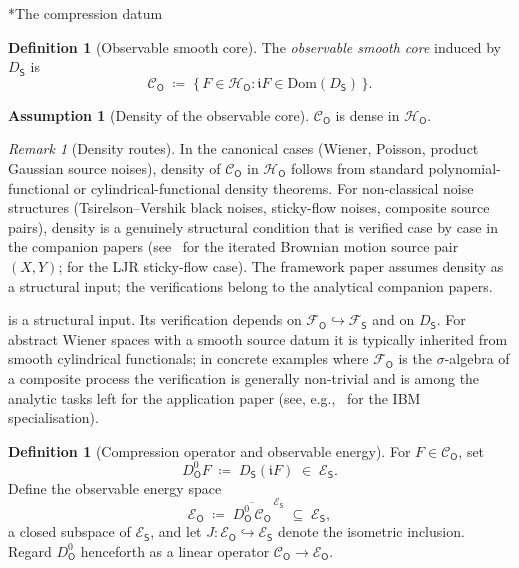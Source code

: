 \documentclass[11pt,reqno]{amsart}
\makeatletter
\renewcommand\subsection{\@startsection{subsection}{2}%
  \z@{.7\linespacing}{.5\linespacing}%
  {\normalfont\centering\scshape}}
\theoremstyle{plain}
\theoremstyle{definition}
\newtheorem{definition}[theorem]{Definition}
\newtheorem{assumption}[theorem]{Assumption}
\theoremstyle{remark}
\newtheorem{remark}[theorem]{Remark}
\newcommand{\Hilb}{\mathcal{H}}
\newcommand{\Dom}{\mathrm{Dom}}
\newcommand{\Energy}{\mathcal{E}}
\newcommand{\Source}{\mathsf{S}}
\newcommand{\Obs}{\mathsf{O}}
\renewcommand{\iota}{\mathfrak{i}}
\makeatother
\begin{document}
\subsection*{The compression datum}

\begin{definition}[Observable smooth core]\label{def:obs-core}
The \emph{observable smooth core} induced by $D_\Source$ is
\[
  \mathcal C_\Obs
  \;\coloneqq\;
  \bigl\{\,F\in\Hilb_\Obs : \iota F\in\Dom(D_\Source)\,\bigr\}.
\]
\end{definition}

\begin{assumption}[Density of the observable core]\label{ass:dense}
$\mathcal C_\Obs$ is dense in $\Hilb_\Obs$.
\end{assumption}

\begin{remark}[Density routes]\label{rem:density-routes}
In the canonical cases (Wiener, Poisson, product Gaussian source
noises), density of $\mathcal C_\Obs$ in $\Hilb_\Obs$ follows from
standard polynomial-functional or cylindrical-functional density
theorems. For non-classical noise structures (Tsirelson--Vershik
black noises, sticky-flow noises, composite source pairs), density
is a genuinely structural condition that is verified case by case in
the companion papers (see~\cite{IBMPaper} for the iterated Brownian
motion source pair $(X,Y)$; \cite{StickyFlowNoiseLift} for the LJR
sticky-flow case). The framework paper assumes density as a
structural input; the verifications belong to the analytical
companion papers.
\end{remark}

 is a structural input. Its verification depends on
$\mathcal F_\Obs\hookrightarrow\mathcal F_\Source$ and on $D_\Source$.
For abstract Wiener spaces with a smooth source datum it is typically
inherited from smooth cylindrical functionals; in concrete examples
where $\mathcal F_\Obs$ is the $\sigma$-algebra of a composite process
the verification is generally non-trivial and is among the analytic
tasks left for the application paper (see, e.g.,~\cite{IBMPaper} for
the IBM specialisation).

\begin{definition}[Compression operator and observable energy]
\label{def:compression}
For $F\in\mathcal C_\Obs$, set
\[
  D_\Obs^{0} F \;\coloneqq\; D_\Source(\iota F) \;\in\; \Energy_\Source.
\]
Define the observable energy space
\[
  \Energy_\Obs
  \;\coloneqq\;
  \overline{D_\Obs^{0}\,\mathcal C_\Obs}^{\,\Energy_\Source}
  \;\subseteq\;\Energy_\Source,
\]
a closed subspace of $\Energy_\Source$, and let
$J\colon\Energy_\Obs\hookrightarrow\Energy_\Source$ denote the
isometric inclusion. Regard $D_\Obs^{0}$ henceforth as a linear
operator $\mathcal C_\Obs\to\Energy_\Obs$.
\end{definition}
\end{document}
